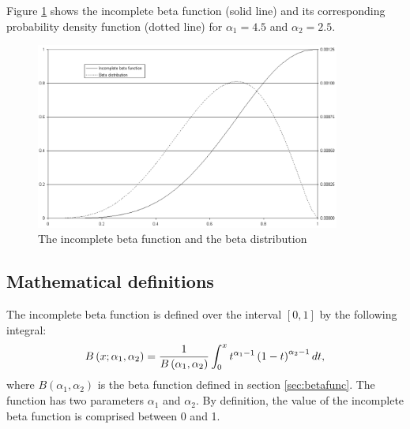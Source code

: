 \documentclass[twoside]{book}
\begin{document}
Figure \ref{fig:incBetaFunction} shows the incomplete beta
function (solid line) and its corresponding probability density
function (dotted line) for $\alpha_1=4.5$ and $\alpha_2=2.5$.
\begin{figure}
\centering\includegraphics[width=10cm]{Figures/IncompleteBetaFunction}
\caption{The incomplete beta function and the beta distribution}\label{fig:incBetaFunction}
\end{figure}

\subsection{Mathematical definitions}
The incomplete beta function is defined over the interval
$\left[0,1\right]$ by the following integral:
\begin{equation}
\label{eq:incBetaFunction}
  B\left(x;\alpha_1,\alpha_2\right)={1\over B\left(\alpha_1,\alpha_2\right)}
  \int_0^x t^{\alpha_1-1}\left(1-t\right)^{\alpha_2-1}dt,
\end{equation}
where $B\left(\alpha_1,\alpha_2\right)$ is the beta function
defined in section \ref{sec:betafunc}. The function has two
parameters $\alpha_1$ and $\alpha_2$. By definition, the value of
the incomplete beta function is comprised between 0 and 1.
\end{document}
